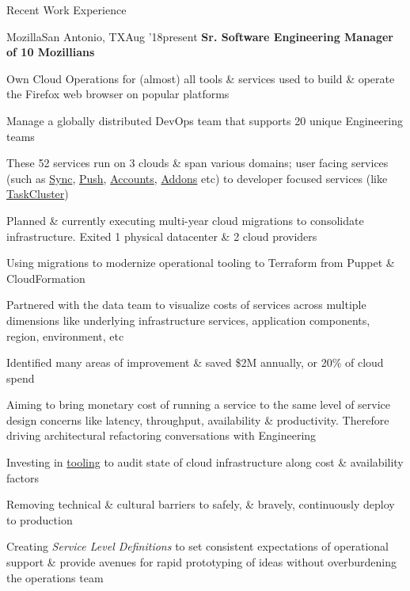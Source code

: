 \documentclass{resume} %
\begin{document}
\begin{rSection}{Recent Work Experience}


\begin{rSubsection}{Mozilla}{San Antonio, TX}{Aug '18}{present}
  {\textbf{Sr. Software Engineering Manager of 10 Mozillians}}

\item Own Cloud Operations for (almost) all tools \& services used to build \& operate the Firefox web browser on popular platforms
\item Manage a globally distributed DevOps team that supports 20 unique Engineering teams
  \item These 52 services run on 3 clouds \& span various domains; user facing services (such as \href{https://github.com/mozilla-services/syncstorage-rs}{Sync}, \href{https://github.com/mozilla-services/autopush-rs}{Push}, \href{https://github.com/mozilla/fxa}{Accounts}, \href{https://github.com/mozilla/addons}{Addons} etc) to developer focused services (like \href{https://github.com/taskcluster}{TaskCluster})
  \item Planned \& currently executing multi-year cloud migrations to consolidate infrastructure. Exited 1 physical datacenter \& 2 cloud providers
  \item Using migrations to modernize operational tooling to Terraform from Puppet \& CloudFormation
    \item Partnered with the data team to visualize costs of services across multiple dimensions like underlying infrastructure services, application components, region, environment, etc
    \item Identified many areas of improvement \& saved \$2M annually, or 20\% of cloud spend
    \item Aiming to bring monetary cost of running a service to the same level of service design concerns like latency, throughput, availability \& productivity. Therefore driving architectural refactoring conversations with Engineering
    \item Investing in \href{https://github.com/mozilla/frost}{tooling} to audit state of cloud infrastructure along cost \& availability factors
    \item Removing technical \& cultural barriers to safely, \& bravely, continuously deploy to production
    \item Creating \textit{Service Level Definitions} to set consistent expectations of operational support \& provide avenues for rapid prototyping of ideas without overburdening the operations team

\end{rSubsection}
\end{rSection}
\end{document}
